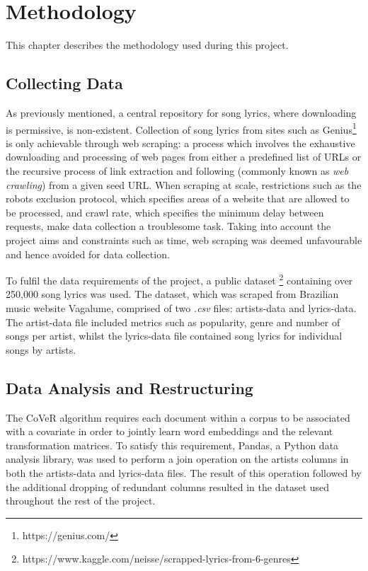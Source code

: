 \chapter{Methodology}
This chapter describes the methodology used during this project. 
\label{chap:data_methodology}
\section{Collecting Data}
As previously mentioned, a central repository for song lyrics, where downloading is permissive, is non-existent. Collection of song lyrics from sites such as Genius\footnote{https://genius.com/} is only achievable through web scraping: a process which involves the exhaustive downloading and processing of web pages from either a predefined list of URLs or the recursive process of link extraction and following (commonly known as \textit{web crawling}) from a given seed URL. When scraping at scale, restrictions such as the robots exclusion protocol, which specifies areas of a website that are allowed to be processed, and crawl rate, which specifies the minimum delay between requests, make data collection a troublesome task. Taking into account the project aims and constraints such as time, web scraping was deemed unfavourable and hence avoided for data collection.

\noindent
\newline
To fulfil the data requirements of the project, a public dataset \footnote{https://www.kaggle.com/neisse/scrapped-lyrics-from-6-genres} containing over 250,000 song lyrics was used. The dataset, which was scraped from Brazilian music website Vagalume, comprised of two \textit{.csv} files: artists-data and lyrics-data. The artist-data file included metrics such as popularity, genre and number of songs per artist, whilst the lyrics-data file contained song lyrics for individual songs by artists.

\section{Data Analysis and Restructuring}
The CoVeR algorithm requires each document within a corpus to be associated with a covariate in order to jointly learn word embeddings and the relevant transformation matrices. To satisfy this requirement, Pandas, a Python data analysis library, was used to perform a join operation on the artists columns in both the artists-data and lyrics-data files. The result of this operation followed by the additional dropping of redundant columns resulted in the dataset used throughout the rest of the project.

